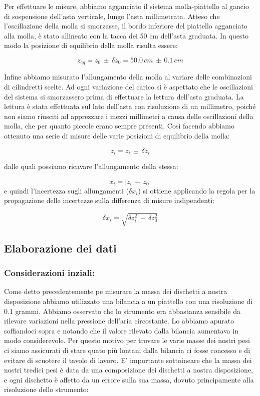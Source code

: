 Per effettuare le misure, abbiamo agganciato il sistema molla-piattello al gancio di sospensione dell'asta verticale, lungo l'asta millimetrata. Atteso che l'oscillazione della molla si smorzasse, il bordo inferiore del piattello agganciato alla molla, è stato allineato con la tacca dei 50 cm dell'asta graduata. In questo modo la posizione di equilibrio della molla risulta essere:

\begin{equation*}
	z_{eq} = z_0\,\pm\,\delta z_0 = 50.0\,cm\,\pm\,0.1\,cm
\end{equation*}

Infine abbiamo misurato l'allungamento della molla al variare delle combinazioni di cilindretti scelte. Ad ogni variazione del carico si è aspettato che le oscillazioni del sistema si smorzassero prima di effettuare la lettura dell'asta graduata. La lettura è stata effettuata sul lato dell'asta con risoluzione di un millimetro, poiché non siamo riusciti ad apprezzare i mezzi millimetri a causa delle oscillazioni della molla, che per quanto piccole erano sempre presenti. Così facendo abbiamo ottenuto una serie di misure delle varie posizioni di equilibrio della molla:

\begin{equation*}
	z_i = z_i\,\pm\,\delta z_i 
\end{equation*}

dalle quali possiamo ricavare l'allungamento della stessa:

\begin{equation*}
	x_i = |z_i\,-\,z_0|
\end{equation*}
e quindi l’incertezza sugli allungamenti ($\delta x_i$) si ottiene applicando la regola per la propagazione delle incertezze sulla differenza di misure indipendenti:

\begin{equation*}
	\delta x_i = \sqrt{\delta z_i^2\,-\,\delta z_0^2}
\end{equation*}

\subsection{Elaborazione dei dati}

\subsubsection{Considerazioni inziali:}
Come detto precedentemente pe misurare la massa dei dischetti a nostra disposizione abbiamo utilizzato una bilancia a un piattello con una risoluzione di 0.1 grammi. Abbiamo osservato che lo strumento era abbastanza sensibile da rilevare variazioni nella pressione dell'aria circostante. Lo abbiamo apurato soffiandoci sopra e notando che il valore rilevato dalla bilancia aumentava in modo considerevole. Per questo motivo per trovare le varie masse dei nostri pesi ci siamo assicurati di stare quato più lontani dalla bilancia ci fosse concesso e di evitare di scuotere il tavolo di lavoro.
E' importante sottoineare che la massa dei nostri tredici pesi è data da una composizione dei dischetti a nostra disposizione, e ogni dischetto è affetto da un errore sulla sua massa, dovuto principamente alla risoluzione dello strumento:

